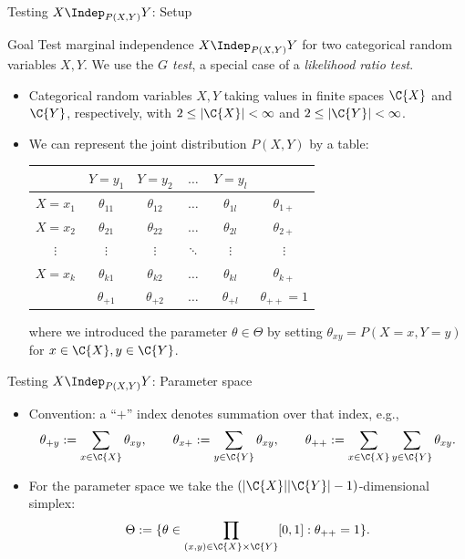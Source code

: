 \begin{frame}{Testing $X \Indep_{P(X,Y)} Y$: Setup}
  \begin{block}{Goal}
    Test marginal independence $X \Indep_{P(X,Y)} Y$ for two categorical random variables $X,Y$.
    We use the \emph{$G$ test}, a special case of a \emph{likelihood ratio test}.
  \end{block}
  \begin{itemize}
    \item Categorical random variables $X,Y$ taking values in finite spaces $\C{X}$ and $\C{Y}$,
respectively, with $2 \le |\C{X}| < \infty$ and $2 \le |\C{Y}| < \infty$.
    \item We can represent the joint distribution $P(X,Y)$ by a table:
\begin{center}\small\begin{tabular}{c|cccc|c}
  & $Y=y_1$         & $Y=y_2$ & $\dots$ & $Y=y_l$ \\
  \hline
  $X=x_1$ & $\theta_{11}$      & $\theta_{12}$      & $\dots$ & $\theta_{1l}$ & $\theta_{1+}$\\
  $X=x_2$ & $\theta_{21}$      & $\theta_{22}$      & $\dots$ & $\theta_{2l}$ & $\theta_{2+}$\\
  $\vdots$ & $\vdots$     & $\vdots$       & $\ddots$ & $\vdots$  & $\vdots$ \\
  $X=x_k$ & $\theta_{k1}$      & $\theta_{k2}$      & $\dots$ & $\theta_{kl}$ & $\theta_{k+}$ \\
  \hline
  & $\theta_{+ 1}$ & $\theta_{+ 2}$ & $\dots$ & $\theta_{+ l}$ & $\theta_{++}=1$\\
\end{tabular}\end{center}
where we introduced the parameter $\theta \in \Theta$ by setting $\theta_{xy} = P(X=x,Y=y)$ for
$x \in \C{X}, y \in \C{Y}$.
  \end{itemize}
\end{frame}

\begin{frame}{Testing $X \Indep_{P(X,Y)} Y$: Parameter space}
  \begin{itemize}
\item Convention: a ``$+$'' index denotes summation over that index, e.g.,
$$\theta_{+ y} := \sum_{x\in\C{X}} \theta_{xy}, \qquad \theta_{x+} := \sum_{y\in\C{Y}} \theta_{xy}, \qquad \theta_{++} := \sum_{x\in\C{X}}\sum_{y\in\C{Y}} \theta_{xy}.$$
\item For the parameter space we take the $(|\C{X}||\C{Y}|-1)$-dimensional simplex:
$$\Theta := \{ \theta \in \prod_{(x,y)\in\C{X}\times\C{Y}} [0,1] : \theta_{+ +} = 1 \}.$$
  \end{itemize}
\end{frame}


